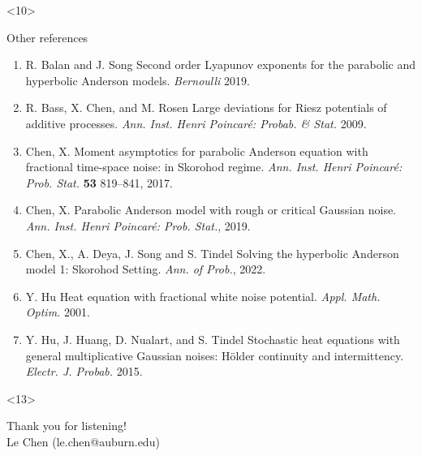 \documentclass[9pt,table,xcolor=dvipsnames]{beamer}%
\begin{document}
\begin{frame}<10> %
  \begin{center}
    Other references
  \end{center}
  \vfill

\footnotesize
\begin{enumerate}
  \item \textcolor{refcolor}{R. Balan and J. Song} Second order Lyapunov exponents for the parabolic and hyperbolic Anderson models. \textcolor{journal_color}{\em Bernoulli} 2019.
  \item \textcolor{refcolor}{R. Bass, X. Chen, and M. Rosen} Large deviations for Riesz potentials of additive processes. \textcolor{journal_color}{\em Ann. Inst. Henri Poincar\'e: Probab. \& Stat.} 2009.
  \item \textcolor{refcolor}{Chen, X. } Moment asymptotics for parabolic Anderson equation with fractional time-space noise: in Skorohod regime. \textcolor{journal_color}{\em Ann. Inst. Henri
    Poincar\'e: Prob. Stat.} {\bf 53} 819--841, 2017.
  \item \textcolor{refcolor}{Chen, X. } Parabolic Anderson model with rough or critical Gaussian noise. \textcolor{journal_color}{\em Ann. Inst. Henri Poincar\'e: Prob. Stat.}, 2019.
  \item \textcolor{refcolor}{Chen, X., A. Deya, J. Song and S. Tindel} Solving the hyperbolic Anderson model 1: Skorohod Setting. \textcolor{journal_color}{\em Ann. of Prob.},  2022.
  \item \textcolor{refcolor}{Y. Hu} Heat equation with fractional white noise potential. \textcolor{journal_color}{\em Appl. Math. Optim.} 2001.
  \item \textcolor{refcolor}{Y. Hu, J. Huang, D. Nualart, and S. Tindel} Stochastic heat equations with general multiplicative Gaussian noises: H\"older continuity and intermittency.
    \textcolor{journal_color}{\em Electr. J. Probab.} 2015.
\end{enumerate}
\end{frame}
\begin{frame}<13> %
\footnotesize \hfill
\begin{center}
  {\Huge Thank you for listening!}\\[3em]
  {\small Le Chen (le.chen@auburn.edu)}
\end{center}
\end{frame}
\end{document}
